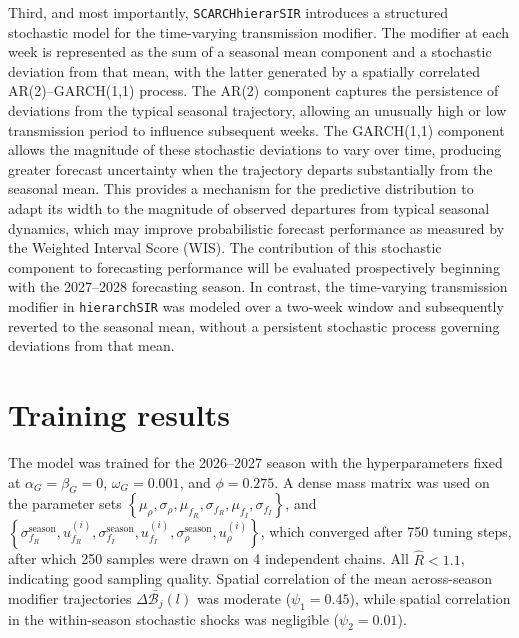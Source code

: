 \documentclass[11pt]{article}
\begin{document}
Third, and most importantly, \texttt{SCARCHhierarSIR} introduces a structured stochastic model for the time-varying transmission modifier. The modifier at each week is represented as the sum of a seasonal mean component and a stochastic deviation from that mean, with the latter generated by a spatially correlated AR(2)--GARCH(1,1) process. The AR(2) component captures the persistence of deviations from the typical seasonal trajectory, allowing an unusually high or low transmission period to influence subsequent weeks. The GARCH(1,1) component allows the magnitude of these stochastic deviations to vary over time, producing greater forecast uncertainty when the trajectory departs substantially from the seasonal mean. This provides a mechanism for the predictive distribution to adapt its width to the magnitude of observed departures from typical seasonal dynamics, which may improve probabilistic forecast performance as measured by the Weighted Interval Score (WIS). The contribution of this stochastic component to forecasting performance will be evaluated prospectively beginning with the 2027--2028 forecasting season. In contrast, the time-varying transmission modifier in \texttt{hierarchSIR} was modeled over a two-week window and subsequently reverted to the seasonal mean, without a persistent stochastic process governing deviations from that mean.

\section{Training results}

The model was trained for the 2026--2027 season with the hyperparameters fixed at $\alpha_G=\beta_G=0$, $\omega_G=0.001$, and $\phi=0.275$. A dense mass matrix was used on the parameter sets $\left\{ \mu_{\rho}, \sigma_{\rho}, \mu_{f_R}, \sigma_{f_R}, \mu_{f_I}, \sigma_{f_I} \right\}$, and $\left\{ \sigma^{\text{season}}_{f_R}, u^{(i)}_{f_R}, \sigma^{\text{season}}_{f_I}, u^{(i)}_{f_I}, \sigma^{\text{season}}_{\rho}, u^{(i)}_{\rho} \right\}$, which converged after 750 tuning steps, after which 250 samples were drawn on 4 independent chains. All $\hat{R} < 1.1$, indicating good sampling quality. Spatial correlation of the mean across-season modifier trajectories $\Delta \bar{\mathcal{B}_j} (l)$ was moderate ($\psi_1 = 0.45$), while spatial correlation in the within-season stochastic shocks was negligible ($\psi_2 = 0.01$).
\end{document}
